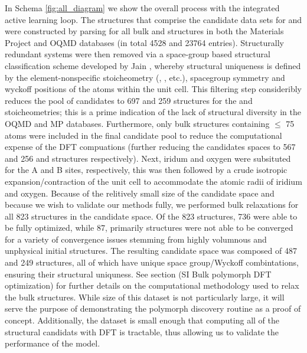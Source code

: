 %
In Schema \ref{fig:all_diagram} we show the overall process with the integrated active learning loop.
The structures that comprise the candidate data sets for \IrOtwo and \IrOthree were constructed by parsing for all bulk \ABtwo and \ABthree structures in both the Materials Project\cite{Jain2013} and OQMD\cite{Kirklin2015} databases
(in total 4528 \ABtwo and 23764 \ABthree entries).
%
Structurally redundant systems were then removed via a space-group based structural classification scheme developed by Jain  \cite{Jain2018},
whereby structural uniqueness is defined by the element-nonspecific stoicheometry (\ABtwo, \ABthree, etc.), spacegroup symmetry and wyckoff positions of the atoms within the unit cell.
%
This filtering step consideribly reduces the pool of candidates to 697 and 259 structures for the \ABtwo and \ABthree stoicheometries;  %
this is a prime indication of the lack of structural diversity in the OQMD and MP databases.
Furthermore, only bulk structures containing $\leq$ 75 atoms were included in the final candidate pool to reduce the computational expense of the DFT compuations
(further reducing the candidates spaces to 567 and 256 \ABtwo and \ABthree structures respectively).
%
Next, iridum and oxygen were subsituted for the A and B sites, respectively,
this was then followed by a crude isotropic expansion/contraction of the unit cell to accommodate the atomic radii of iridium and oxygen.
Because of the relitively small size of the candidate space and because we wish to validate our methods fully, we performed bulk relaxations for all 823 structures in the candidate space.
%
Of the 823 structures, 736 were able to be fully optimized, while 87, primarily \ABtwo structures were not able to be converged for a variety of convergence issues stemming from highly volumnous and unphysical initial structures.
%
The resulting candidate space was composed of 487 \IrOtwo and 249 \IrOthree structures, all of which have unique space group/Wyckoff combintations, ensuring their structural uniquness.
%
See section (SI Bulk polymorph DFT optimization) for further details on the computational methodology used to relax the bulk structures.
%
While size of this dataset is not particularly large, it will serve the purpose of demonstrating the polymorph discovery routine as a proof of concept.
%
Additionally, the dataset is small enough that computing all of the structural candidats with  DFT is tractable, thus allowing us to validate the performance of the model.


